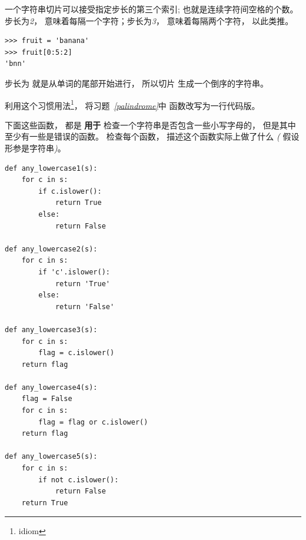 \begin{exercise}
    
    


一个字符串切片可以接受指定步长的第三个索引; 也就是连续字符间空格的个数。  步长为{\em 2}， 意味着每隔一个字符；步长为{\em 3}， 意味着每隔两个字符， 以此类推。

\begin{lstlisting}
>>> fruit = 'banana'
>>> fruit[0:5:2]
'bnn'
\end{lstlisting}


步长为 {\em {}} 就是从单词的尾部开始进行， 所以切片 {\em \li{[::-1]}} 生成一个倒序的字符串。


利用这个习惯用法\footnote{idiom}， 将习题~{\em \ref{palindrome}}中 {\em {}} 函数改写为一行代码版。

\end{exercise}

\begin{exercise}


下面这些函数， 都是 {\bf 用于} 检查一个字符串是否包含一些小写字母的， 但是其中至少有一些是错误的函数。  检查每个函数， 描述这个函数实际上做了什么 {\em (} 假设形参是字符串{\em )}。

\begin{em}
\begin{lstlisting}
def any_lowercase1(s):
    for c in s:
        if c.islower():
            return True
        else:
            return False

def any_lowercase2(s):
    for c in s:
        if 'c'.islower():
            return 'True'
        else:
            return 'False'

def any_lowercase3(s):
    for c in s:
        flag = c.islower()
    return flag

def any_lowercase4(s):
    flag = False
    for c in s:
        flag = flag or c.islower()
    return flag

def any_lowercase5(s):
    for c in s:
        if not c.islower():
            return False
    return True
\end{lstlisting}
\end{em}

\end{exercise}


